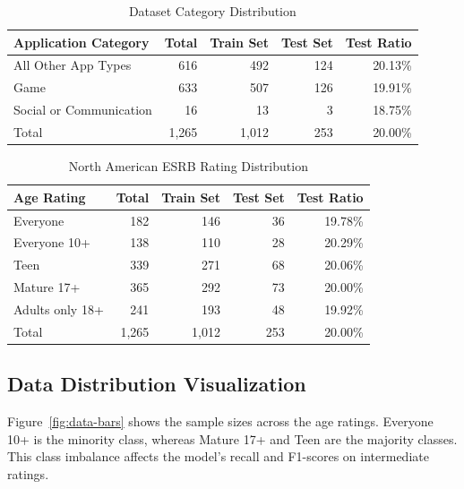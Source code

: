 \documentclass[11pt,a4paper]{article}
\begin{document}
\begin{table}[H]
\centering
\caption{Dataset Category Distribution}
\label{tab:category-distribution}
\renewcommand{\arraystretch}{1.25}
\begin{tabular}{lrrrr}
\toprule
Application Category & Total & Train Set & Test Set & Test Ratio \\
\midrule
All Other App Types & 616 & 492 & 124 & 20.13\% \\
Game & 633 & 507 & 126 & 19.91\% \\
Social or Communication & 16 & 13 & 3 & 18.75\% \\
\midrule
Total & 1,265 & 1,012 & 253 & 20.00\% \\
\bottomrule
\end{tabular}
\end{table}

\begin{table}[H]
\centering
\caption{North American ESRB Rating Distribution}
\label{tab:rating-distribution}
\renewcommand{\arraystretch}{1.25}
\begin{tabular}{lrrrr}
\toprule
Age Rating & Total & Train Set & Test Set & Test Ratio \\
\midrule
Everyone & 182 & 146 & 36 & 19.78\% \\
Everyone 10+ & 138 & 110 & 28 & 20.29\% \\
Teen & 339 & 271 & 68 & 20.06\% \\
Mature 17+ & 365 & 292 & 73 & 20.00\% \\
Adults only 18+ & 241 & 193 & 48 & 19.92\% \\
\midrule
Total & 1,265 & 1,012 & 253 & 20.00\% \\
\bottomrule
\end{tabular}
\end{table}

\subsection{Data Distribution Visualization}

Figure~\ref{fig:data-bars} shows the sample sizes across the age ratings. Everyone 10+ is the minority class, whereas Mature 17+ and Teen are the majority classes. This class imbalance affects the model's recall and F1-scores on intermediate ratings.
\end{document}
